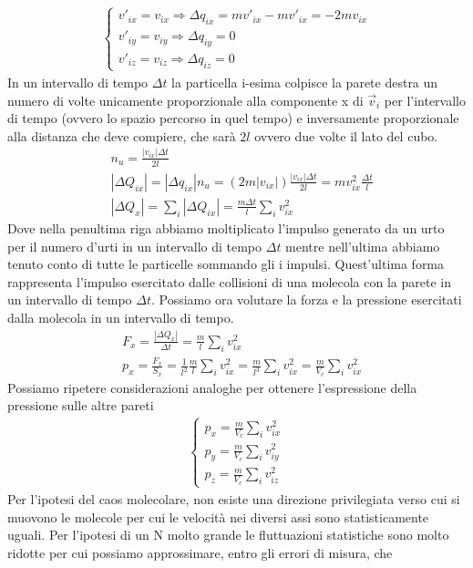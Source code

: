\documentclass[10pt,a4paper]{article}
\begin{document}
\begin{align*}
	\begin{cases}
		v'_{ix}=v_{ix} \Rightarrow \Delta q_{ix} = mv'_{ix}-mv'_{ix}=-2mv_{ix}\\
		v'_{iy}=v_{iy} \Rightarrow \Delta q_{iy} = 0\\
		v'_{iz}=v_{iz} \Rightarrow \Delta q_{iz} = 0
	\end{cases}
\end{align*}
In un intervallo di tempo $\Delta t$ la particella i-esima colpisce la parete destra un numero di volte unicamente proporzionale alla componente x di $\vec{v}_i$ per l'intervallo di tempo (ovvero lo spazio percorso in quel tempo) e inversamente proporzionale alla distanza che deve compiere, che sarà $2l$ ovvero due volte il lato del cubo. 
\begin{align*}
	&n_u = \frac{|v_{ix}| \Delta t}{2l}\\
	&|\Delta Q_{ix}|= |\Delta q_{ix}| n_u = (2m|v_{ix}|) \frac{|v_{ix}| \Delta t}{2l} = m v_{ix}^2 \frac{\Delta t}{l}\\
	&|\Delta Q_{x}| = \sum_i |\Delta Q_{ix}|= \frac{m \Delta t}{l} \sum_i v_{ix}^2 
\end{align*}
Dove nella penultima riga abbiamo moltiplicato l'impulso generato da un urto per il numero d'urti in un intervallo di tempo $\Delta t$ mentre nell'ultima abbiamo tenuto conto di tutte le particelle sommando gli i impulsi. Quest'ultima forma rappresenta l'impulso esercitato dalle collisioni di una molecola con la parete in un intervallo di tempo $\Delta t$.
Possiamo ora volutare la forza e la pressione esercitati dalla molecola in un intervallo di tempo. 
\begin{align*}
	&F_x = \frac{|\Delta Q_{x}|}{\Delta t} =  \frac{m}{l} \sum_i v_{ix}^2\\
	&p_x = \frac{F_{x}}{S_x} =  \frac{1}{l^2}\frac{m}{l} \sum_i v_{ix}^2=\frac{m}{l^3} \sum_i v_{ix}^2 = \frac{m}{V_c} \sum_i v_{ix}^2
\end{align*}
Possiamo ripetere considerazioni analoghe per ottenere l'espressione della pressione sulle altre pareti
\begin{align*}
	\begin{cases}
		p_x = \frac{m}{V_c} \sum_i v_{ix}^2\\
		p_y = \frac{m}{V_c} \sum_i v_{iy}^2\\
		p_z = \frac{m}{V_c} \sum_i v_{iz}^2
	\end{cases}
\end{align*}
Per l'ipotesi del caos molecolare, non esiste una direzione privilegiata verso cui si muovono le molecole per cui le velocità nei diversi assi sono statisticamente uguali. Per l'ipotesi di un N molto grande le fluttuazioni statistiche sono molto ridotte per cui possiamo approssimare, entro gli errori di misura, che 
\end{document}
